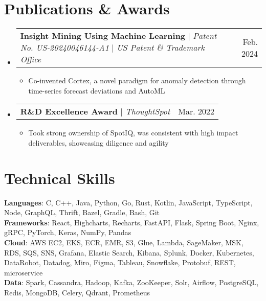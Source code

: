\documentclass[letterpaper,11pt]{article}
\makeatletter
\newcommand{\resumeItem}[1]{
  \item\small{
    {#1 \vspace{-2pt}}
  }
}
\newcommand{\resumeProjectHeading}[2]{
    \item
    \begin{tabular*}{0.97\textwidth}{l@{\extracolsep{\fill}}r}
      \small#1 & #2 \\
    \end{tabular*}\vspace{-7pt}
}
\newcommand{\resumeSubHeadingListStart}{\begin{itemize}[leftmargin=0.15in, label={}]}
\newcommand{\resumeSubHeadingListEnd}{\end{itemize}}
\newcommand{\resumeItemListStart}{\begin{itemize}}
\newcommand{\resumeItemListEnd}{\end{itemize}\vspace{-6pt}}
\makeatother
\begin{document}
%
\section{Publications \& Awards}
    \resumeSubHeadingListStart
      \resumeProjectHeading
          {\textbf{Insight Mining Using Machine Learning} $|$ \emph{Patent No. US-20240046144-A1} $|$ \emph{US Patent \& Trademark Office}}{Feb. 2024}
          \resumeItemListStart
            \resumeItem{Co-invented Cortex, a novel paradigm for anomaly detection through time-series forecast deviations and AutoML}
          \resumeItemListEnd
      \resumeProjectHeading
          {\textbf{R\&D Excellence Award} $|$ \emph{ThoughtSpot}}{Mar. 2022}
          \resumeItemListStart
            \resumeItem{Took strong ownership of SpotIQ, was consistent with high impact deliverables, showcasing diligence and agility}
          \resumeItemListEnd
    \resumeSubHeadingListEnd


%
\section{Technical Skills}
 \begin{itemize}[leftmargin=0.1in, label={}]
    \small{\item{
     \textbf{Languages}{: C, C++, Java, Python, Go, Rust, Kotlin, JavaScript, TypeScript, Node, GraphQL, Thrift, Bazel, Gradle, Bash, Git} \\
     \textbf{Frameworks}{: React, Highcharts, Recharts, FastAPI, Flask, Spring Boot, Nginx, gRPC, PyTorch, Keras, NumPy, Pandas} \\
     \textbf{Cloud}{: AWS EC2, EKS, ECR, EMR, S3, Glue, Lambda, SageMaker, MSK, RDS, SQS, SNS, Grafana, Elastic Search, Kibana, Splunk, Docker, Kubernetes, DataRobot, Datadog, Miro, Figma, Tableau, Snowflake, Protobuf, REST, microservice} \\
     \textbf{Data}{: Spark, Cassandra, Hadoop, Kafka, ZooKeeper, Solr, Airflow, PostgreSQL, Redis, MongoDB, Celery, Qdrant, Prometheus}
    }}
 \end{itemize}



\end{document}
